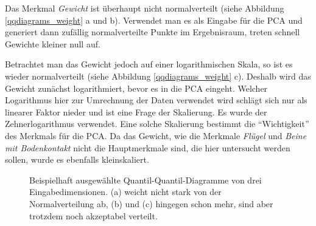  Das Merkmal \emph{Gewicht} ist überhaupt nicht normalverteilt (siehe Abbildung \ref{qqdiagrams_weight} a und b). Verwendet man es als Eingabe für die PCA und generiert dann zufällig normalverteilte Punkte im Ergebnisraum, treten schnell Gewichte kleiner null auf.
 
 Betrachtet man das Gewicht jedoch auf einer logarithmischen Skala, so ist es wieder normalverteilt (siehe Abbildung \ref{qqdiagrams_weight} c). Deshalb wird das Gewicht zunächst logarithmiert, bevor es in die PCA eingeht.
 Welcher Logarithmus hier zur Umrechnung der Daten verwendet wird schlägt sich nur als linearer Faktor nieder und ist eine Frage der Skalierung. Es wurde der Zehnerlogarithmus verwendet. Eine solche Skalierung bestimmt die "`Wichtigkeit"' des Merkmals für die PCA. Da das Gewicht, wie die Merkmale \emph{Flügel} und \emph{Beine mit Bodenkontakt} nicht die Hauptmerkmale sind, die hier untersucht werden sollen, wurde es ebenfalls kleinskaliert.
 
 \begin{figure}
  \qquad
  \qquad
  
  \caption{Beispielhaft ausgewählte Quantil-Quantil-Diagramme von drei Eingabedimensionen. (a) weicht nicht stark von der Normalverteilung ab, (b) und (c) hingegen schon mehr, sind aber trotzdem noch akzeptabel verteilt.}
  \label{qqdiagram_examples}
 \end{figure}
 
